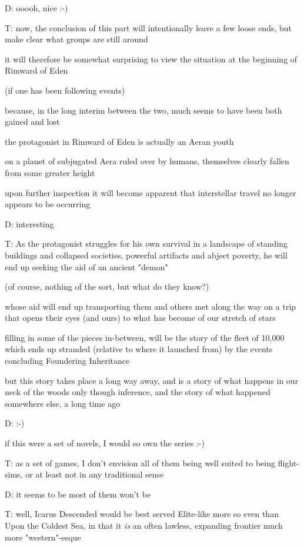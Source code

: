D: ooooh, nice :-)

T: now, the conclusion of this part will intentionally leave a few loose ends, but make clear what groups are still around

it will therefore be somewhat surprising to view the situation at the beginning of Rimward of Eden

(if one has been following events)

because, in the long interim between the two, much seems to have been both gained and lost

the protagonist in Rimward of Eden is actually an Aeran youth

on a planet of subjugated Aera ruled over by humans, themselves clearly fallen from some greater height 

upon further inspection it will become apparent that interstellar travel no longer appears to be occurring

D: interesting

T: As the protagonist struggles for his own survival in a landscape of standing buildings and collapsed societies, powerful artifacts and abject poverty, he will end up seeking the aid of an ancient "demon"

(of course, nothing of the sort, but what do they know?)

whose aid will end up transporting them and others met along the way on a trip that opens their eyes (and ours) to what has become of our stretch of stars

filling in some of the pieces in-between, will be the story of the fleet of 10,000 which ends up stranded (relative to where it launched from) by the events concluding Foundering Inheritance

but this story takes place a long way away, and is a story of what happens in our neck of the woods only though inference, and the story of what happened somewhere else, a long time ago

D: :-)

if this were a set of novels, I would so own the series :-)

T: as a set of games, I don't envision all of them being well suited to being flight-sims, or at least not in any traditional sense

D: it seems to be most of them won't be

T: well, Icarus Descended would be best served Elite-like
more so even than Upon the Coldest Sea, in that it {\em is} an often lawless, expanding frontier
much more "western"-esque

